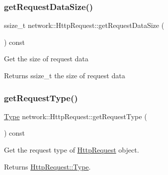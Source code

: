 \subsubsection{\texorpdfstring{get\+Request\+Data\+Size()}{getRequestDataSize()}\hspace{0.1cm}{\footnotesize\ttfamily [2/2]}}
{\footnotesize\ttfamily ssize\+\_\+t network\+::\+Http\+Request\+::get\+Request\+Data\+Size (\begin{DoxyParamCaption}{ }\end{DoxyParamCaption}) const\hspace{0.3cm}{\ttfamily [inline]}}

Get the size of request data

\begin{DoxyReturn}{Returns}
ssize\+\_\+t the size of request data 
\end{DoxyReturn}
\mbox{\label{classnetwork_1_1HttpRequest_ad9faf7f8b3f7a86a94f650271eea5442}} 
\subsubsection{\texorpdfstring{get\+Request\+Type()}{getRequestType()}\hspace{0.1cm}{\footnotesize\ttfamily [1/2]}}
{\footnotesize\ttfamily \hyperlink{classnetwork_1_1HttpRequest_abcc6d7ee2ea91a721d32fd6d396743fe}{Type} network\+::\+Http\+Request\+::get\+Request\+Type (\begin{DoxyParamCaption}{ }\end{DoxyParamCaption}) const\hspace{0.3cm}{\ttfamily [inline]}}

Get the request type of \hyperlink{classnetwork_1_1HttpRequest}{Http\+Request} object.

\begin{DoxyReturn}{Returns}
\hyperlink{classnetwork_1_1HttpRequest_abcc6d7ee2ea91a721d32fd6d396743fe}{Http\+Request\+::\+Type}. 
\end{DoxyReturn}
\mbox{\label{classnetwork_1_1HttpRequest_ad9faf7f8b3f7a86a94f650271eea5442}} 
